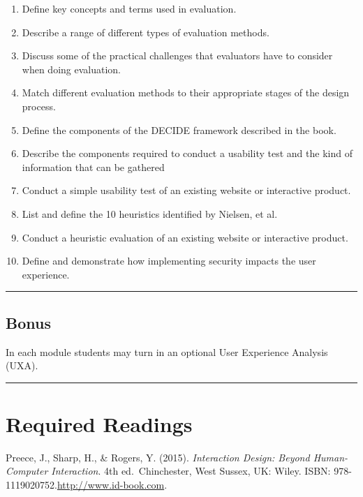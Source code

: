 \documentclass[]{article}
\providecommand{\tightlist}{%
  \setlength{\itemsep}{0pt}\setlength{\parskip}{0pt}}
\begin{document}
\begin{enumerate}
\def\labelenumi{\arabic{enumi}.}
\tightlist
\item
  Define key concepts and terms used in evaluation.
\item
  Describe a range of different types of evaluation methods.
\item
  Discuss some of the practical challenges that evaluators have to
  consider when doing evaluation.
\item
  Match different evaluation methods to their appropriate stages of the
  design process.
\item
  Define the components of the DECIDE framework described in the book.
\item
  Describe the components required to conduct a usability test and the
  kind of information that can be gathered
\item
  Conduct a simple usability test of an existing website or interactive
  product.
\item
  List and define the 10 heuristics identified by Nielsen, et al.
\item
  Conduct a heuristic evaluation of an existing website or interactive
  product.
\item
  Define and demonstrate how implementing security impacts the user
  experience.
\end{enumerate}

\begin{center}\rule{0.5\linewidth}{\linethickness}\end{center}

\hypertarget{bonus}{%
\subsection{Bonus}\label{bonus}}

In each module students may turn in an optional User Experience Analysis
(UXA).

\begin{center}\rule{0.5\linewidth}{\linethickness}\end{center}

\hypertarget{required-readings}{%
\section{Required Readings}\label{required-readings}}

Preece, J., Sharp, H., \& Rogers, Y. (2015). \emph{Interaction Design:
Beyond Human-Computer Interaction}. 4th ed.~Chinchester, West Sussex,
UK: Wiley. ISBN: 978-1119020752.\url{http://www.id-book.com}.
\end{document}
